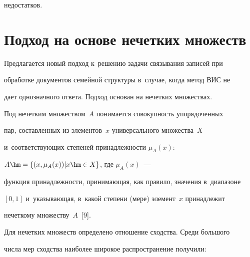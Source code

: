 недостатков.


  


\section{Подход на основе нечетких множеств}





  Предлагается новый подход к~решению задачи связывания записей при 


обработке документов семейной структуры в~случае, когда метод ВИС не 


дает однозначного ответа. Подход основан на нечетких множествах.


  


  Под нечетким множеством~$A$ понимается совокупность упорядоченных 


пар, составленных из элементов~$x$ универсального множества~$X$ 


и~со\-от\-вет\-ст\-ву\-ющих степеней принадлежности $\mu_A(x)$:  


$A\hm= \left\{ (x,\mu_A(x))\vert x\hm\in X\right\}$, где $\mu_A(x)$~--- 


функция принадлежности, принимающая, как правило, значения в~диапазоне 


$[0,1]$ и~указывающая, в~какой степени (мере) элемент~$x$ принадлежит 


нечеткому множеству~$A$~[9].


  


  Для нечетких множеств определено отношение сходства. Среди большого 


числа мер сходства наиболее широкое распространение получили:


